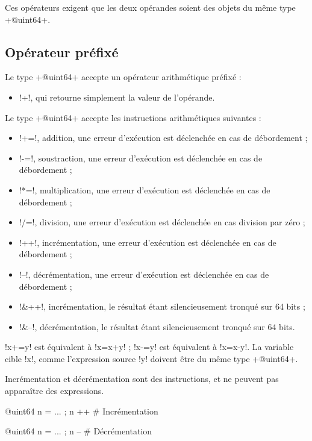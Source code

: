 Ces opérateurs exigent que les deux opérandes soient des objets du même type \ggs+@uint64+. 

\subsection{Opérateur préfixé}
Le type \ggs+@uint64+ accepte un opérateur arithmétique préfixé :
\begin{itemize}
  \item \ggs!+!, qui retourne simplement la valeur de l'opérande.
\end{itemize}


Le type \ggs+@uint64+ accepte les instructions arithmétiques suivantes :
\begin{itemize}
  \item \ggs!+=!, addition, une erreur d'exécution est déclenchée en cas de débordement ;
  \item \ggs!-=!, soustraction, une erreur d'exécution est déclenchée en cas de débordement ;
  \item \ggs!*=!, multiplication, une erreur d'exécution est déclenchée en cas de débordement ;
  \item \ggs!/=!, division, une erreur d'exécution est déclenchée en cas division par zéro ;
  \item \ggs!++!, incrémentation, une erreur d'exécution est déclenchée en cas de débordement ;
  \item \ggs!--!, décrémentation, une erreur d'exécution est déclenchée en cas de débordement ;
  \item \ggs!&++!, incrémentation, le résultat étant silencieusement tronqué sur 64 bits ;
  \item \ggs!&--!, décrémentation, le résultat étant silencieusement tronqué sur 64 bits.
\end{itemize}

\ggs!x+=y! est équivalent à \ggs!x=x+y! ; \ggs!x-=y! est équivalent à \ggs!x=x-y!.
La variable cible \ggs!x!, comme l'expression source \ggs!y! doivent être du même type \ggs+@uint64+. 

Incrémentation et décrémentation sont des instructions, et ne peuvent pas apparaître des expressions.
\begin{galgas}
@uint64 n = ... ; n ++ # Incrémentation
\end{galgas}

\begin{galgas}
@uint64 n = ... ; n -- # Décrémentation
\end{galgas}


